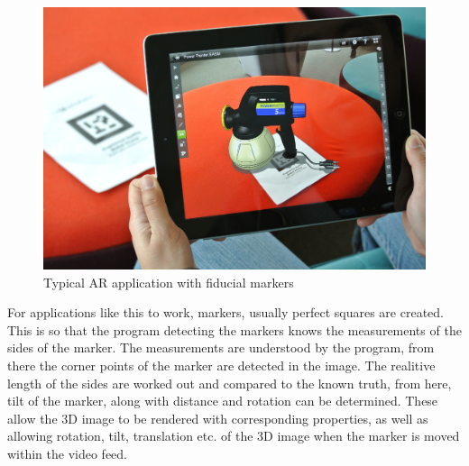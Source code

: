 \documentclass[11pt]{article}
\begin{document}
\begin{figure}[!h]
	\centering
	\includegraphics[scale=0.9]{pics/fiducialexample.jpg}
	\caption{Typical AR application with fiducial markers}
	\label{fiducialexample}
\end{figure}

For applications like this to work, markers, usually perfect squares are
created. This is so that the program detecting the markers knows the 
measurements of the sides of the marker. The measurements are understood by
the program, from there the corner points of the marker are detected in 
the image. The realitive length of the sides are worked out and
compared to the known truth, from here, tilt of the marker, along with
distance and rotation can be determined. These allow the 3D image to be 
rendered with corresponding properties, as well as allowing rotation, tilt,
translation etc. of the 3D image when the marker is moved within 
the video feed.
\end{document}
